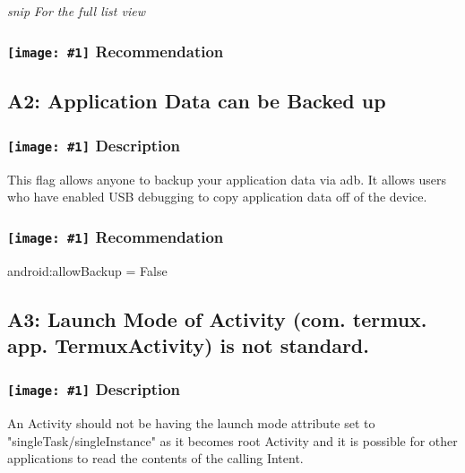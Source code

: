 \documentclass[12p]{article}
\newcommand{\icon}[1]{\texttt{[image: \#1]}}
\begin{document}




\textit{snip}
\newline \textsl{For the full list view }
\subsubsection*{\protect\icon{/home/miki/Documents/GITHUB/AndroidPermissions/python/vulns/report_icons/basic_todo.png} Recommendation}

\subsection{A2: Application Data can be Backed up}
\subsubsection*{\protect\icon{/home/miki/Documents/GITHUB/AndroidPermissions/python/vulns/report_icons/basic_sheet.png} Description}
This flag allows anyone to backup your application data via adb. It allows users who have enabled USB debugging to copy application data off of the device.
\subsubsection*{\protect\icon{/home/miki/Documents/GITHUB/AndroidPermissions/python/vulns/report_icons/basic_todo.png} Recommendation}
android:allowBackup = False
\subsection{A3: Launch Mode of Activity (com. termux. app. TermuxActivity) is not standard.}
\subsubsection*{\protect\icon{/home/miki/Documents/GITHUB/AndroidPermissions/python/vulns/report_icons/basic_sheet.png} Description}
An Activity should not be having the launch mode attribute set to "singleTask/singleInstance" as it becomes root Activity and it is possible for other applications to read the contents of the calling Intent.
\end{document}
